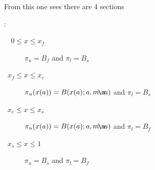 \documentclass[12pt,letterpaper]{article}
\begin{document}
\allowbreak
\nopagebreak
{}
\begin{minipage}{\linewidth}
\hspace{-.5ex}From this one sees there are 4 sections\addtocounter{footnote}{-1}\footnotemark:
\begin{description}
   \item[$ \phantom{x_f}0 \le x \le x_f\phantom{1}$] $\pi_u=B_f$ and $\pi_l=B_s$
   \item[$ \phantom{0}x_f \le x \le x_c\phantom{1}$] $\pi_u(x(a))=B(x(a);a,m\!\m\! a)$ and $\pi_l=B_s$
   \item[$ \phantom{0}x_c \le x \le x_s\phantom{1}$] $\pi_u(x(a))=B(x(a);a,m\!\m\! a)$ and $\pi_l=B_f$
   \item[$ \phantom{0}x_s \le x \le 1\phantom{x_s}$] $\pi_u=B_s$ and $\pi_l=B_f$
\end{description}
\end{minipage}
\end{document}

